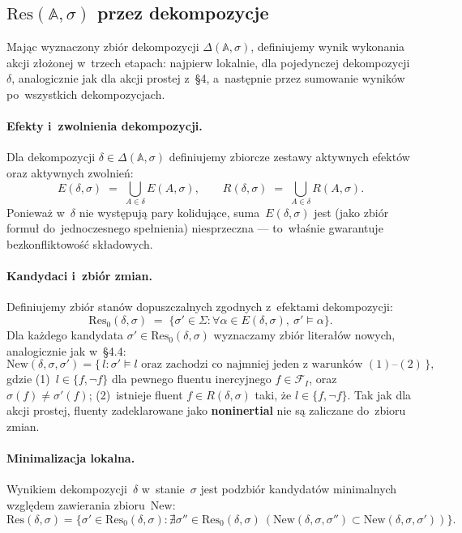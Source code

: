 \documentclass[11pt,a4paper]{article}
\newcommand{\noninertial}{\textbf{noninertial}}
\theoremstyle{definition}
\begin{document}
\subsection{\texorpdfstring{$\mathrm{Res}(\mathbb{A}, \sigma)$}{Res(A,sigma)} przez dekompozycje}
\label{sec:res-zlozone}

Mając wyznaczony zbiór dekompozycji $\Delta(\mathbb{A},\sigma)$,
definiujemy wynik wykonania akcji złożonej w~trzech etapach: najpierw
lokalnie, dla pojedynczej dekompozycji $\delta$, analogicznie jak dla
akcji prostej z~\S4, a~następnie przez sumowanie wyników po~wszystkich
dekompozycjach.

\paragraph{Efekty i~zwolnienia dekompozycji.}
Dla dekompozycji $\delta \in \Delta(\mathbb{A},\sigma)$ definiujemy
zbiorcze zestawy aktywnych efektów oraz aktywnych zwolnień:
\[
  E(\delta,\sigma) \;=\; \bigcup_{A \in \delta} E(A,\sigma),
  \qquad
  R(\delta,\sigma) \;=\; \bigcup_{A \in \delta} R(A,\sigma).
\]
Ponieważ w~$\delta$ nie występują pary kolidujące, suma~$E(\delta,\sigma)$
jest (jako zbiór formuł do~jednoczesnego spełnienia) niesprzeczna ---
to~właśnie gwarantuje bezkonfliktowość składowych.

\paragraph{Kandydaci i~zbiór zmian.}
Definiujemy zbiór stanów dopuszczalnych zgodnych z~efektami
dekompozycji:
\[
  \mathrm{Res}_0(\delta,\sigma)
    \;=\; \{\sigma' \in \Sigma :
      \forall \alpha \in E(\delta,\sigma),\ \sigma' \models \alpha\}.
\]
Dla każdego kandydata $\sigma' \in \mathrm{Res}_0(\delta,\sigma)$
wyznaczamy zbiór literałów nowych, analogicznie jak w~\S4.4:
\[
  \mathrm{New}(\delta,\sigma,\sigma')
    = \{\, l : \sigma' \models l \text{ oraz zachodzi co najmniej jeden
      z~warunków } (1)\text{--}(2)\,\},
\]
gdzie (1)~$l \in \{f, \neg f\}$ dla pewnego fluentu inercyjnego
$f \in \mathcal{F}_I$, oraz $\sigma(f)\neq\sigma'(f)$;
(2)~istnieje fluent $f \in R(\delta,\sigma)$ taki, że $l \in \{f, \neg f\}$.
Tak jak dla akcji prostej, fluenty zadeklarowane jako \noninertial{}
nie są zaliczane do~zbioru zmian.

\paragraph{Minimalizacja lokalna.}
Wynikiem dekompozycji~$\delta$ w~stanie~$\sigma$ jest podzbiór
kandydatów minimalnych względem zawierania zbioru~$\mathrm{New}$:
\[
  \mathrm{Res}(\delta,\sigma)
  = \{\sigma' \in \mathrm{Res}_0(\delta,\sigma) :
    \nexists \sigma'' \in \mathrm{Res}_0(\delta,\sigma)\
    (\mathrm{New}(\delta,\sigma,\sigma'') \subset
     \mathrm{New}(\delta,\sigma,\sigma'))\}.
\]
\end{document}
